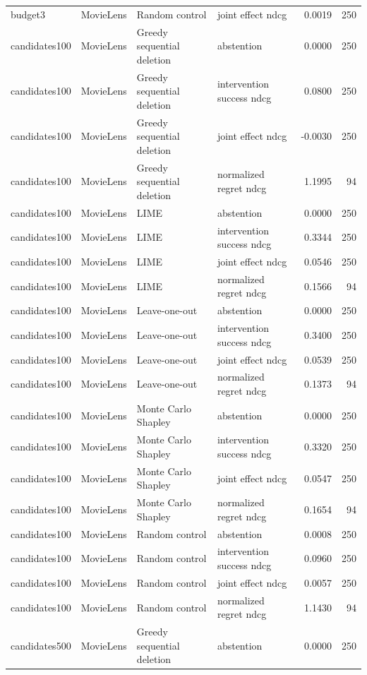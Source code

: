 \begin{longtable}{@{}p{}p{}p{}p{}rr@{}}
budget3 & MovieLens & Random control & joint effect ndcg & 0.0019 & 250 \\
candidates100 & MovieLens & Greedy sequential deletion & abstention & 0.0000 & 250 \\
candidates100 & MovieLens & Greedy sequential deletion & intervention success ndcg & 0.0800 & 250 \\
candidates100 & MovieLens & Greedy sequential deletion & joint effect ndcg & -0.0030 & 250 \\
candidates100 & MovieLens & Greedy sequential deletion & normalized regret ndcg & 1.1995 & 94 \\
candidates100 & MovieLens & LIME & abstention & 0.0000 & 250 \\
candidates100 & MovieLens & LIME & intervention success ndcg & 0.3344 & 250 \\
candidates100 & MovieLens & LIME & joint effect ndcg & 0.0546 & 250 \\
candidates100 & MovieLens & LIME & normalized regret ndcg & 0.1566 & 94 \\
candidates100 & MovieLens & Leave-one-out & abstention & 0.0000 & 250 \\
candidates100 & MovieLens & Leave-one-out & intervention success ndcg & 0.3400 & 250 \\
candidates100 & MovieLens & Leave-one-out & joint effect ndcg & 0.0539 & 250 \\
candidates100 & MovieLens & Leave-one-out & normalized regret ndcg & 0.1373 & 94 \\
candidates100 & MovieLens & Monte Carlo Shapley & abstention & 0.0000 & 250 \\
candidates100 & MovieLens & Monte Carlo Shapley & intervention success ndcg & 0.3320 & 250 \\
candidates100 & MovieLens & Monte Carlo Shapley & joint effect ndcg & 0.0547 & 250 \\
candidates100 & MovieLens & Monte Carlo Shapley & normalized regret ndcg & 0.1654 & 94 \\
candidates100 & MovieLens & Random control & abstention & 0.0008 & 250 \\
candidates100 & MovieLens & Random control & intervention success ndcg & 0.0960 & 250 \\
candidates100 & MovieLens & Random control & joint effect ndcg & 0.0057 & 250 \\
candidates100 & MovieLens & Random control & normalized regret ndcg & 1.1430 & 94 \\
candidates500 & MovieLens & Greedy sequential deletion & abstention & 0.0000 & 250 \\

\end{longtable}

